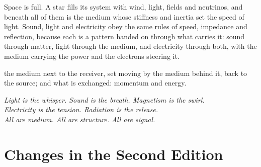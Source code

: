 Space is full. A star fills its system with wind, light, fields and neutrinos, and beneath all of them is the medium whose stiffness and inertia set the speed of light. Sound, light and electricity obey the same rules of speed, impedance and reflection, because each is a pattern handed on through what carries it: sound through matter, light through the medium, and electricity through both, with the medium carrying the power and the electrons steering it.

 the medium next to the receiver, set moving by the medium behind it, back to the source; and what is exchanged: momentum and energy.

\par\noindent\begin{minipage}{\linewidth}\begin{center}\itshape
Light is the whisper. Sound is the breath. Magnetism is the swirl.\\
Electricity is the tension. Radiation is the release.\\
All are medium. All are structure. All are signal.
\end{center}\end{minipage}

\clearpage
\section*{Changes in the Second Edition}
\small
